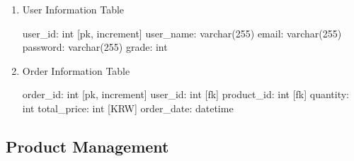 \documentclass[conference]{IEEEtran}
\begin{document}
\begin{enumerate}
\begin{itemize}
\end{itemize}

\item User Information Table

user\_id: int [pk, increment] \newline\hspace*{1.2ex}
user\_name: varchar(255) \newline\hspace*{1.2ex}
email: varchar(255) \newline\hspace*{1.2ex}
password: varchar(255) \newline\hspace*{1.2ex}
grade: int

\hspace{0.5em}{\scriptsize Table attribute can be changed in development.}

\item Order Information Table

order\_id: int [pk, increment] \newline\hspace*{1.2ex}
user\_id: int [fk] \newline\hspace*{1.2ex}
product\_id: int [fk] \newline\hspace*{1.2ex}
quantity: int \newline\hspace*{1.2ex}
total\_price: int [KRW] \newline\hspace*{1.2ex}
order\_date: datetime

\hspace{0.5em}{\scriptsize Table attribute can be changed in development.}

\end{enumerate}

\subsection{Product Management}
\end{document}
